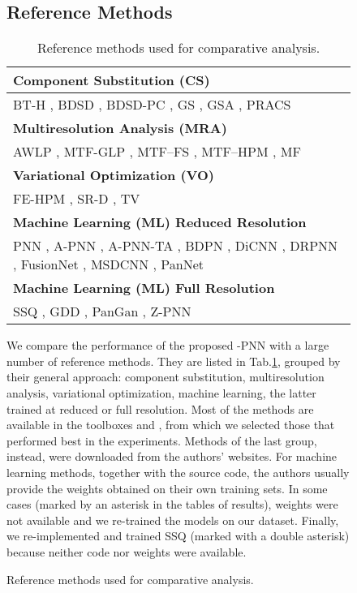 \documentclass[journal]{IEEEtran}
\newcommand{\ru} {\rule{0mm}{3mm}}
\begin{document}
\begin{figure}
\subsection{Reference Methods}

\begin{table}
\centering
\setlength{\tabcolsep}{4pt}
\begin{tabular}{p{8.4cm}}
\multicolumn{1}{l}{\ru \bf Component Substitution (CS)}              \\ \hline \ru
BT-H \cite{Lolli2017}, BDSD \cite{Garzelli2008}, BDSD-PC \cite{Vivone2019}, GS \cite{Laben2000}, GSA \cite{Aiazzi2007}, PRACS \cite{Choi2011} \vspace{2mm} \\
\multicolumn{1}{l}{\ru \bf Multiresolution Analysis (MRA)}           \\ \hline \ru
AWLP \cite{Otazu2005}, MTF-GLP \cite{Alparone2017}, MTF--FS \cite{Vivone2018a}, MTF--HPM \cite{Alparone2017}, MF \cite{Restaino2016} \vspace{2mm} \\
\multicolumn{1}{l}{\ru \bf Variational Optimization (VO)}            \\ \hline \ru
FE-HPM \cite{Vivone2015a}, SR-D \cite{Vicinanza2015}, TV \cite{Palsson2014} \vspace{2mm} \\
\multicolumn{1}{l}{\ru \bf Machine Learning (ML) Reduced Resolution} \\ \hline \ru
PNN \cite{Masi2016}, A-PNN \cite{Scarpa2018a}, A-PNN-TA \cite{Scarpa2018a}, BDPN \cite{Zhan2019}, DiCNN \cite{He2019}, DRPNN \cite{Wei2017L}, FusionNet \cite{Deng2020}, MSDCNN \cite{Yuan2018}, PanNet \cite{Yang2017} \vspace{2mm} \\
\multicolumn{1}{l}{\ru \bf Machine Learning (ML) Full Resolution}    \\ \hline \ru
SSQ \cite{Luo2020}, GDD \cite{Uezato2020}, PanGan \cite{Ma2020}, Z-PNN \cite{Ciotola2022} \\
\end{tabular}
\caption{Reference methods used for comparative analysis.}
\label{tab:methods}
\end{table}

We compare the performance of the proposed -PNN with a large number of reference methods.
They are listed in Tab.\ref{tab:methods}, grouped by their general approach:
component substitution, multiresolution analysis, variational optimization, machine learning,
the latter trained at reduced or full resolution.
Most of the methods are available in the toolboxes \cite{Vivone2020} and \cite{Deng2022}, from which we selected those that performed best in the experiments.
Methods of the last group, instead, were downloaded from the authors' websites.
For machine learning methods,
together with the source code, the authors usually provide the weights obtained on their own training sets.
In some cases (marked by an asterisk in the tables of results), weights were not available and we re-trained the models on our dataset.
Finally, we re-implemented and trained SSQ (marked with a double asterisk) because neither code nor weights were available.



\end{figure}
\end{document}
